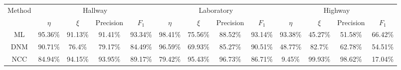 \documentclass[12pt]{article}
\begin{document}
\eject \pdfpagewidth=1.2in \pdfpageheight=9.4in

\begin{landscape}
\begin{table}[t]
    \centering
    \begin{tabular}{c|cccc|cccc|cccc}
      \hline
      \multirow{2}{*}{Method} 
      & \multicolumn{4}{c|}{Hallway} 
      & \multicolumn{4}{c|}{Laboratory} 
      & \multicolumn{4}{c}{Highway} \\
      \cline{2-13}
      & $\eta$ & $\xi$ & Precision & $F_1$ 
      & $\eta$ & $\xi$ & Precision & $F_1$ 
      & $\eta$ & $\xi$ & Precision & $F_1$ \\
      \hline \hline
      ML   & 95.36\% & 91.13\% & 91.41\% & 93.34\% & 
             98.41\% & 75.56\% & 88.52\% & 93.14\% & 
             93.38\% & 45.27\% & 51.58\% & 66.42\% \\
      DNM  & 90.71\% & 76.4\%  & 79.17\% & 84.49\% & 
             96.59\% & 69.93\% & 85.27\% & 90.51\% & 
             48.77\% & 82.7\%  & 62.78\% & 54.51\% \\
      NCC  & 84.94\% & 94.15\% & 93.95\% & 89.17\% & 
             79.42\% & 95.43\% & 96.73\% & 86.71\% & 
             9.45\%  & 99.93\% & 98.62\% & 17.04\% \\
      \hline
    \end{tabular}
\end{table}
\end{landscape}
\end{document}
